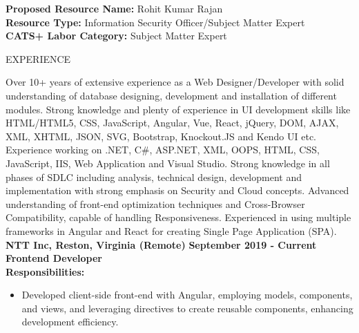 \documentclass{resume} %
\begin{document}
\begin{flushleft}
    \textbf{Proposed Resource Name:} Rohit Kumar Rajan \\
    \textbf{Resource Type:} Information Security Officer/Subject Matter Expert \\
    \textbf{CATS+ Labor Category:} Subject Matter Expert
\end{flushleft}

\vspace{1.3em}

\begin{rSection}{EXPERIENCE}
        \begin{flushleft}
        Over 10+ years of extensive experience as a Web Designer/Developer with solid understanding of database designing, development and installation of different modules. Strong knowledge and plenty of experience in UI development skills like HTML/HTML5, CSS, JavaScript, Angular, Vue, React, jQuery, DOM, AJAX, XML, XHTML, JSON, SVG, Bootstrap, Knockout.JS and Kendo UI etc. Experience working on .NET, C\#, ASP.NET, XML, OOPS, HTML, CSS, JavaScript, IIS, Web Application and Visual Studio. Strong knowledge in all phases of SDLC including analysis, technical design, development and implementation with strong emphasis on Security and Cloud concepts. Advanced understanding of front{-}end optimization techniques and Cross{-}Browser Compatibility, capable of handling Responsiveness. Experienced in using multiple frameworks in Angular and React for creating Single Page Application (SPA). \\
        \vspace{1em} 
            \textbf{NTT Inc, Reston, Virginia (Remote)} \hfill \textbf{September 2019 {-} Current} \\
            \textbf{Frontend Developer} \\
            \vspace{1em}
            \textbf{Responsibilities:} \\
            \begin{itemize}
                                    \item Developed client{-}side front{-}end with Angular, employing models, components, and views, and leveraging directives to create reusable components, enhancing development efficiency.

\end{itemize}
\end{flushleft}
\end{rSection}
\end{document}
